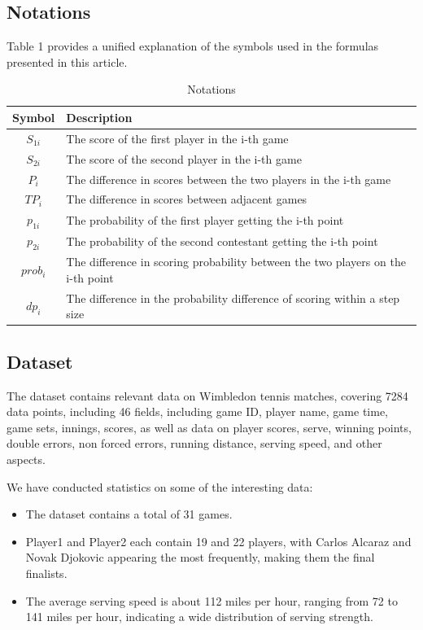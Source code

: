 \documentclass{mcmthesis}
\begin{document}
\subsection{Notations}
Table 1 provides a unified explanation of the symbols used in the formulas presented in this article.
\begin{table}[]
	\centering
	\begin{tabular}{cl}
		\hline
		\textbf{Symbol}   & \textbf{Description}                                                                     \\ \hline
		$S_{1i}$ & The score of the first player in the i-th game                                  \\ \hline
		$S_{2i}$ & The score of the second player in the i-th game                                 \\ \hline
		$P_i$    & The difference in scores between the two players in the i-th game               \\ \hline
		$TP_i$   & The difference in scores between adjacent games                                 \\ \hline
		$p_{1i}$ & The probability of the first player getting the i-th point                      \\ \hline
		$p_{2i}$ & The probability of the second contestant getting the i-th point                 \\ \hline
		$prob_i$ & The difference in scoring probability between the two players on the i-th point \\ \hline
		$dp_i$   & The difference in the probability difference of scoring within a step size      \\ \hline
	\end{tabular}
	\caption{Notations}
	\label{tab:my-table}
\end{table}

\subsection{Dataset}
The dataset contains relevant data on Wimbledon tennis matches, covering 7284 data points, including 46 fields, including game ID, player name, game time, game sets, innings, scores, as well as data on player scores, serve, winning points, double errors, non forced errors, running distance, serving speed, and other aspects.

We have conducted statistics on some of the interesting data:
\begin{itemize}
  \item The dataset contains a total of 31 games.
  \item Player1 and Player2 each contain 19 and 22 players, with Carlos Alcaraz and Novak Djokovic appearing the most frequently, making them the final finalists.
  \item The average serving speed is about 112 miles per hour, ranging from 72 to 141 miles per hour, indicating a wide distribution of serving strength.
\end{itemize}
\end{document}
